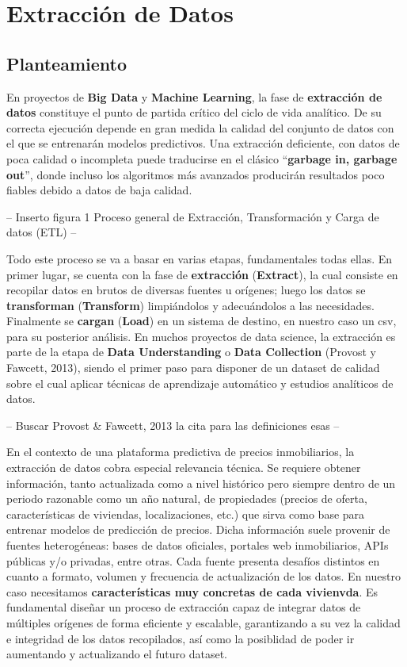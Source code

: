 \documentclass[a4paper,11pt]{book}
\begin{document}
\chapter{Extracción de Datos}

\section{Planteamiento}
En proyectos de \textbf{Big Data} y \textbf{Machine Learning}, la fase de \textbf{extracción de datos} constituye el punto de partida crítico del ciclo de vida analítico. De su correcta ejecución depende en gran medida la calidad del conjunto de datos con el que se entrenarán modelos predictivos. Una extracción deficiente, con datos de poca calidad o incompleta puede traducirse en el clásico “\textbf{garbage in, garbage out}”, donde incluso los algoritmos más avanzados producirán resultados poco fiables debido a datos de baja calidad. 


 -- Inserto figura 1 
 Proceso general de Extracción, Transformación y Carga de datos (ETL)
--

Todo este proceso se va a basar en varias etapas, fundamentales todas ellas. En primer lugar, se cuenta con la fase de \textbf{extracción} (\textbf{Extract}), la cual consiste en recopilar datos en brutos de diversas fuentes u orígenes; luego los datos se \textbf{transforman} (\textbf{Transform}) limpiándolos y adecuándolos a las necesidades. Finalmente se \textbf{cargan} (\textbf{Load}) en un sistema de destino, en nuestro caso un csv, para su posterior análisis. En muchos proyectos de data science, la extracción es parte de la etapa de \textbf{Data Understanding} o \textbf{Data Collection} (Provost y Fawcett, 2013), siendo el primer paso para disponer de un dataset de calidad sobre el cual aplicar técnicas de aprendizaje automático y estudios analíticos de datos.

--
Buscar Provost & Fawcett, 2013 la cita para las definiciones esas
--

En el contexto de una plataforma predictiva de precios inmobiliarios, la extracción de datos cobra especial relevancia técnica. Se requiere obtener información, tanto actualizada como a nivel histórico pero siempre dentro de un periodo razonable como un año natural, de propiedades (precios de oferta, características de viviendas, localizaciones, etc.) que sirva como base para entrenar modelos de predicción de precios. Dicha información suele provenir de fuentes heterogéneas: bases de datos oficiales, portales web inmobiliarios, APIs públicas y/o privadas, entre otras. Cada fuente presenta desafíos distintos en cuanto a formato, volumen y frecuencia de actualización de los datos. En nuestro caso necesitamos \textbf{características muy concretas de cada vivienvda}. Es fundamental diseñar un proceso de extracción capaz de integrar datos de múltiples orígenes de forma eficiente y escalable, garantizando a su vez la calidad e integridad de los datos recopilados, así como la posiblidad de poder ir aumentando y actualizando el futuro dataset. 
\end{document}
